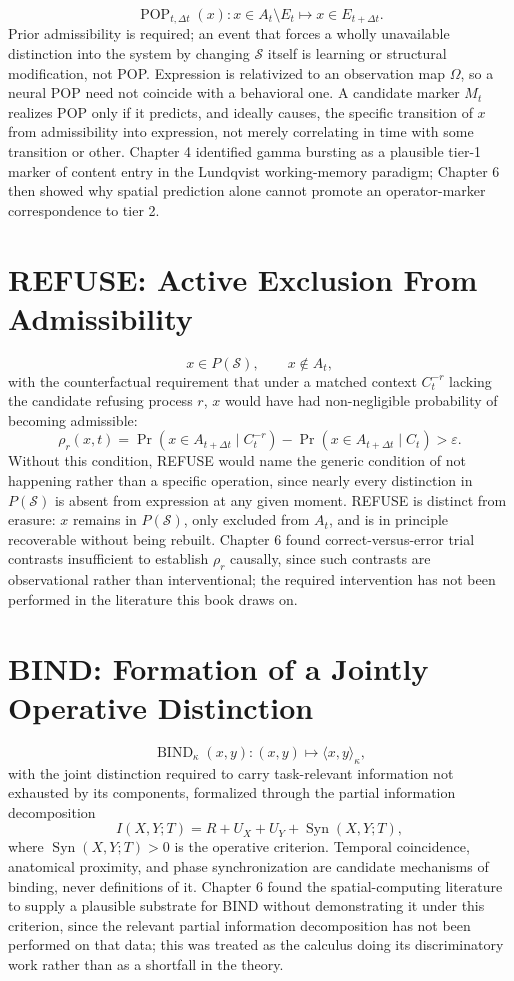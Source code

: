 \documentclass[11pt]{book}
\begin{document}
\[
\operatorname{POP}_{t,\Delta t}(x):
x\in A_t\setminus E_t
\longmapsto
x\in E_{t+\Delta t}.
\]
Prior admissibility is required; an event that forces a wholly unavailable distinction into the system by changing $\mathcal S$ itself is learning or structural modification, not POP. Expression is relativized to an observation map $\Omega$, so a neural POP need not coincide with a behavioral one. A candidate marker $M_t$ realizes POP only if it predicts, and ideally causes, the specific transition of $x$ from admissibility into expression, not merely correlating in time with some transition or other. Chapter 4 identified gamma bursting as a plausible tier-1 marker of content entry in the Lundqvist working-memory paradigm; Chapter 6 then showed why spatial prediction alone cannot promote an operator-marker correspondence to tier 2.

\section*{REFUSE: Active Exclusion From Admissibility}

\[
x\in P(\mathcal S),\qquad x\notin A_t,
\]
with the counterfactual requirement that under a matched context $C_t^{-r}$ lacking the candidate refusing process $r$, $x$ would have had non-negligible probability of becoming admissible:
\[
\rho_r(x,t)=\Pr(x\in A_{t+\Delta t}\mid C_t^{-r})-\Pr(x\in A_{t+\Delta t}\mid C_t)>\varepsilon.
\]
Without this condition, REFUSE would name the generic condition of not happening rather than a specific operation, since nearly every distinction in $P(\mathcal S)$ is absent from expression at any given moment. REFUSE is distinct from erasure: $x$ remains in $P(\mathcal S)$, only excluded from $A_t$, and is in principle recoverable without being rebuilt. Chapter 6 found correct-versus-error trial contrasts insufficient to establish $\rho_r$ causally, since such contrasts are observational rather than interventional; the required intervention has not been performed in the literature this book draws on.

\section*{BIND: Formation of a Jointly Operative Distinction}

\[
\operatorname{BIND}_\kappa(x,y):(x,y)\longmapsto\langle x,y\rangle_\kappa,
\]
with the joint distinction required to carry task-relevant information not exhausted by its components, formalized through the partial information decomposition
\[
I(X,Y;T)=R+U_X+U_Y+\operatorname{Syn}(X,Y;T),
\]
where $\operatorname{Syn}(X,Y;T)>0$ is the operative criterion. Temporal coincidence, anatomical proximity, and phase synchronization are candidate mechanisms of binding, never definitions of it. Chapter 6 found the spatial-computing literature to supply a plausible substrate for BIND without demonstrating it under this criterion, since the relevant partial information decomposition has not been performed on that data; this was treated as the calculus doing its discriminatory work rather than as a shortfall in the theory.
\end{document}
